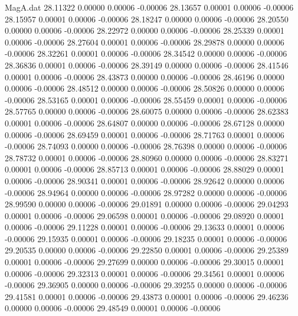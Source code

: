 \begin{filecontents}{MagA.dat}
  28.11322    0.00000    0.00006   -0.00006
  28.13657    0.00001    0.00006   -0.00006
  28.15957    0.00001    0.00006   -0.00006
  28.18247    0.00000    0.00006   -0.00006
  28.20550    0.00000    0.00006   -0.00006
  28.22972    0.00000    0.00006   -0.00006
  28.25339    0.00001    0.00006   -0.00006
  28.27604    0.00001    0.00006   -0.00006
  28.29878    0.00000    0.00006   -0.00006
  28.32261    0.00001    0.00006   -0.00006
  28.34542    0.00000    0.00006   -0.00006
  28.36836    0.00001    0.00006   -0.00006
  28.39149    0.00000    0.00006   -0.00006
  28.41546    0.00001    0.00006   -0.00006
  28.43873    0.00000    0.00006   -0.00006
  28.46196    0.00000    0.00006   -0.00006
  28.48512    0.00000    0.00006   -0.00006
  28.50826    0.00000    0.00006   -0.00006
  28.53165    0.00001    0.00006   -0.00006
  28.55459    0.00001    0.00006   -0.00006
  28.57765    0.00000    0.00006   -0.00006
  28.60075    0.00000    0.00006   -0.00006
  28.62383    0.00001    0.00006   -0.00006
  28.64807    0.00000    0.00006   -0.00006
  28.67128    0.00000    0.00006   -0.00006
  28.69459    0.00001    0.00006   -0.00006
  28.71763    0.00001    0.00006   -0.00006
  28.74093    0.00000    0.00006   -0.00006
  28.76398    0.00000    0.00006   -0.00006
  28.78732    0.00001    0.00006   -0.00006
  28.80960    0.00000    0.00006   -0.00006
  28.83271    0.00001    0.00006   -0.00006
  28.85713    0.00001    0.00006   -0.00006
  28.88029    0.00001    0.00006   -0.00006
  28.90341    0.00001    0.00006   -0.00006
  28.92642    0.00000    0.00006   -0.00006
  28.94964    0.00000    0.00006   -0.00006
  28.97282    0.00000    0.00006   -0.00006
  28.99590    0.00000    0.00006   -0.00006
  29.01891    0.00000    0.00006   -0.00006
  29.04293    0.00001    0.00006   -0.00006
  29.06598    0.00001    0.00006   -0.00006
  29.08920    0.00001    0.00006   -0.00006
  29.11228    0.00001    0.00006   -0.00006
  29.13633    0.00001    0.00006   -0.00006
  29.15935    0.00001    0.00006   -0.00006
  29.18235    0.00001    0.00006   -0.00006
  29.20535    0.00000    0.00006   -0.00006
  29.22850    0.00001    0.00006   -0.00006
  29.25389    0.00001    0.00006   -0.00006
  29.27699    0.00000    0.00006   -0.00006
  29.30015    0.00001    0.00006   -0.00006
  29.32313    0.00001    0.00006   -0.00006
  29.34561    0.00001    0.00006   -0.00006
  29.36905    0.00000    0.00006   -0.00006
  29.39255    0.00000    0.00006   -0.00006
  29.41581    0.00001    0.00006   -0.00006
  29.43873    0.00001    0.00006   -0.00006
  29.46236    0.00000    0.00006   -0.00006
  29.48549    0.00001    0.00006   -0.00006

\end{filecontents}
